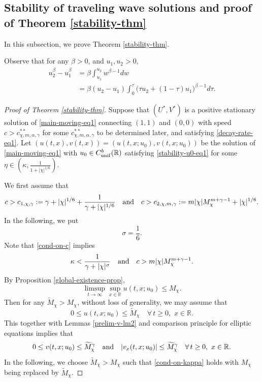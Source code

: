 \documentclass[11pt]{article} %
\theoremstyle{remark}
\theoremstyle{remark}
\numberwithin{equation}{section}
\numberwithin{figure}{section}
\numberwithin{table}{section}
\newcommand\RR{\ensuremath{\mathbb{R}}}
\begin{document}
\subsection{Stability of traveling wave solutions and proof of Theorem \ref{stability-thm}}



In this subsection, we prove Theorem \ref{stability-thm}.

Observe that for any $\beta>0$, and $u_1,u_2>0$,
\begin{align*}
u_2^{\beta} -u_1^\beta& ={\beta}\int_{u_1}^{u_2} w^{\beta-1} dw\\
&=\beta (u_2-u_1)\int_0^\tau \big(\tau u_2+(1-\tau)u_1\big)^{\beta -1}d\tau.
\end{align*}

\begin{proof}[Proof of Theorem \ref{stability-thm}]
Suppose that $(U^*,V^*)$ is a positive stationary solution of \eqref{main-moving-eq1} connecting $(1,1)$ and $(0,0)$ with speed $c>c^{**}_{\chi,m,\alpha,\gamma}$
for some $c^{**}_{\chi,m,\alpha,\gamma}$ to be determined later, and satisfying \eqref{decay-rate-eq1}.
Let $(u(t,x),v(t,x))=(u(t,x;u_0),v(t,x;u_0))$ be the solution of \eqref{main-moving-eq1} with $u_0\in C_{\rm unif}^b(\RR)$ satisfying \eqref{stability-u0-eq1} for  some $\eta\in (\kappa,\frac{1}{1+|\chi|^{1/6}})$.



We  first assume that
\begin{equation}
\label{cond-on-c}
c>c_{1, \chi,\gamma}:=\gamma+|\chi|^{1/6}+\frac{1}{\gamma +|\chi|^{1/6}}\quad {\rm and}\quad  c>
c_{2,\chi,m,\gamma}:=m |\chi| M_{\chi}^{m+\gamma-1} +|\chi|^{1/6}.
\end{equation}
In the following, we put
$$
\sigma=\frac{1}{6}.
$$
Note that  \eqref{cond-on-c} implies 
\begin{equation}
\label{cond-on-kappa}
 \kappa<\frac{1}{\gamma +|\chi|^\sigma} \quad {\rm and}\quad  c>m|\chi| M_\chi^{m+\gamma-1}.
\end{equation}
By Proposition \ref{global-existence-prop},
$$
\limsup_{t\to\infty} \sup_{x\in\mathbb{R}}u(t,x;u_0)\le M_\chi.
$$
Then for any $\widetilde M_\chi>M_\chi$,  without loss of generality, we may assume that
\begin{equation}
\label{u-bound-eq}
0\le u(t,x;u_0)\le \widetilde M_{\chi}\quad \forall\, t\ge 0,\,\, x\in\mathbb{R}.
\end{equation}
This together with Lemmas \ref{prelim-v-lm2} and comparison principle for elliptic equations  implies that
\begin{equation}
\label{v-bound-eq}
0\le v(t,x;u_0)\le \widetilde M_\chi^\gamma\quad {\rm and}\quad 
 |v_x(t,x;u_0)|\le \widetilde M_{\chi}^\gamma\quad \forall\, t\ge 0,\,\, x\in\mathbb{R}.
\end{equation}
In the following, we choose $\widetilde M_\chi>M_\chi$ such that  \eqref{cond-on-kappa} holds with $M_\chi$ being replaced by $\widetilde M_\chi$.


\end{proof}
\end{document}

